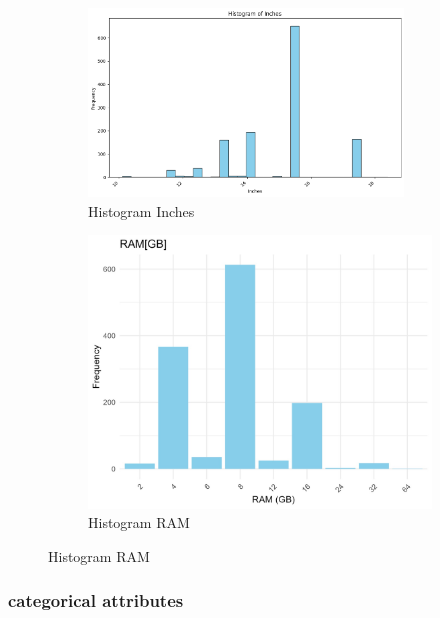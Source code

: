 \documentclass{article}
\begin{document}
\begin{figure}[H]
    \centering
    \begin{subfigure}[b]{0.45\textwidth}
        \centering
        \includegraphics[width=\linewidth, height=5cm]{Histogram_Inches.png} 
        \caption{Histogram Inches}
        \label{fig:figure1}
    \end{subfigure}
    \hspace{0.05\textwidth} %
    \begin{subfigure}[b]{0.45\textwidth}
        \centering
        \includegraphics[width=\linewidth]{Barplot_RAM.jpeg} 
        \caption{Histogram RAM}
        \label{fig:figure2}
    \end{subfigure}
    \label{fig:two_figures}
\end{figure}

\subsubsection{categorical attributes}
\end{document}
